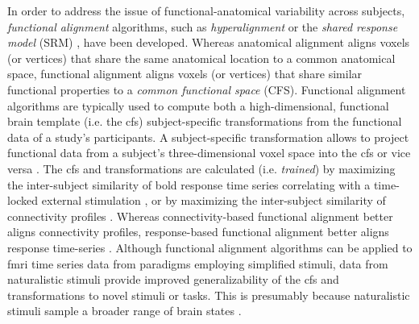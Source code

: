 %
%
In order to address the issue of functional-anatomical variability across
subjects, \textit{functional alignment} algorithms, such as
\textit{hyperalignment} \citep{haxby2011common, guntupalli2016model} or the
\textit{shared response model} (SRM) \citep{chen2015reduced,
zhang2016searchlight}, have been developed.
%
Whereas anatomical alignment aligns voxels (or vertices) that share the same
anatomical location to a common anatomical space, functional alignment aligns
voxels (or vertices) that share similar functional properties to a
\textit{common functional space} (CFS).
%
Functional alignment algorithms are typically used to compute both a
high-dimensional, functional brain template (i.e. the \ac{cfs}) subject-specific
transformations from the functional data of a study's participants.
%
A subject-specific transformation allows to project functional data from a
subject's three-dimensional voxel space into the \ac{cfs} or vice versa
\citep{haxby2020hyperalignment, kumar2020brainiak}.
%
The \ac{cfs} and transformations are calculated (i.e. \textit{trained}) by
maximizing the inter-subject similarity of \ac{bold} response time series
correlating with a time-locked external stimulation \citep{haxby2011common,
chen2015reduced, sabuncu2010function}, or by maximizing the inter-subject
similarity of connectivity profiles \citep{feilong2018reliable,
guntupalli2018computational, nastase2019leveraging}.
%
Whereas connectivity-based functional alignment better aligns connectivity
profiles, response-based functional alignment better aligns response time-series
\citep{guntupalli2018computational}.
%
Although functional alignment algorithms can be applied to \ac{fmri} time series
data from paradigms employing simplified stimuli, data from naturalistic stimuli
provide
%
improved generalizability of the \ac{cfs}
%
and transformations
%
to novel stimuli or tasks.
%
This is presumably because naturalistic stimuli sample a broader range of brain
states \citep{haxby2011common, guntupalli2016model}.

